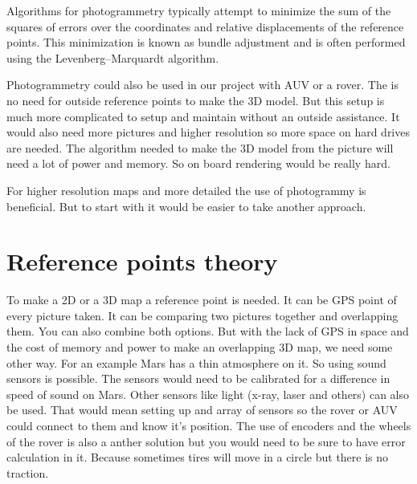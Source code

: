 Algorithms for photogrammetry typically attempt to minimize the sum of the squares of errors over the coordinates and relative displacements of the reference points. This minimization is known as bundle adjustment and is often performed using the Levenberg–Marquardt algorithm.%

Photogrammetry could also be used in our project with AUV or a rover. The is no need for outside reference points to make the 3D model. But this setup is much more complicated to setup and maintain without an outside assistance. It would also need more pictures and higher resolution so more space on hard drives are needed. The algorithm needed to make the 3D model from the picture will need a lot of power and memory. So on board rendering would be really hard.

For higher resolution maps and more detailed the use of photogrammy is beneficial. But to start with it would be easier to take another approach.

\section{Reference points theory}

To make a 2D or a 3D map a reference point is needed. It can be GPS point of every picture taken. It can be comparing two pictures together and overlapping them. You can also combine both options. But with the lack of GPS in space and the cost of memory and power to make an overlapping 3D map, we need some other way. For an example Mars has a thin atmosphere on it. So using sound sensors is possible. The sensors would need to be calibrated for a difference in speed of sound on Mars. Other sensors like light (x-ray, laser and others) can also be used. That would mean setting up and array of sensors so the rover or AUV could connect to them and know it's position. The use of encoders and the wheels of the rover is also a anther solution but you would need to be sure to have error calculation in it. Because sometimes tires will move in a circle but there is no traction.  %







